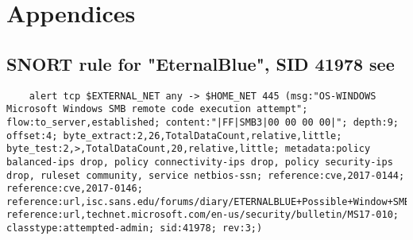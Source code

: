 \documentclass[
	letterpaper, %
	10pt, %
	unnumberedsections, %
	twoside, %
]{APAAssignment}
\begin{document}




\appendix


\clearpage
\chapter{Appendices}
\begin{appendices}
\section{SNORT rule for "EternalBlue", SID 41978 see \cite{SnortEternalBlue}}\label{app:SnortEternalBlue}

\begin{lstlisting}
	alert tcp $EXTERNAL_NET any -> $HOME_NET 445 (msg:"OS-WINDOWS Microsoft Windows SMB remote code execution attempt"; flow:to_server,established; content:"|FF|SMB3|00 00 00 00|"; depth:9; offset:4; byte_extract:2,26,TotalDataCount,relative,little; byte_test:2,>,TotalDataCount,20,relative,little; metadata:policy balanced-ips drop, policy connectivity-ips drop, policy security-ips drop, ruleset community, service netbios-ssn; reference:cve,2017-0144; reference:cve,2017-0146; reference:url,isc.sans.edu/forums/diary/ETERNALBLUE+Possible+Window+SMB+Buffer+Overflow+0Day/22304/; reference:url,technet.microsoft.com/en-us/security/bulletin/MS17-010; classtype:attempted-admin; sid:41978; rev:3;)
\end{lstlisting}








\end{appendices}
\end{document}
